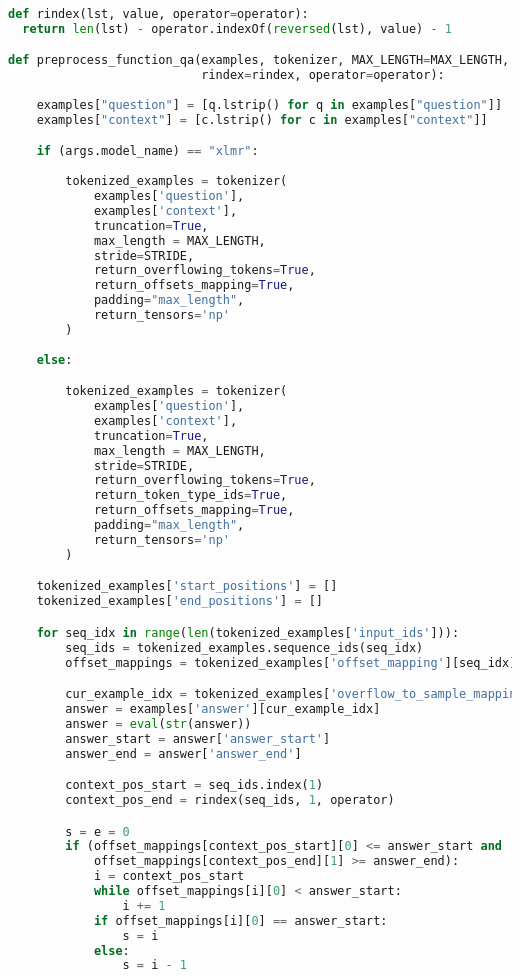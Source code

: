 \begin{lstlisting}[language=Python, caption=Proses \emph{preprocess} dan tokenisasi \emph{dataset} sistem tanya jawab]
def rindex(lst, value, operator=operator):
  return len(lst) - operator.indexOf(reversed(lst), value) - 1

def preprocess_function_qa(examples, tokenizer, MAX_LENGTH=MAX_LENGTH, STRIDE=STRIDE, 
                           rindex=rindex, operator=operator):
    
    examples["question"] = [q.lstrip() for q in examples["question"]]
    examples["context"] = [c.lstrip() for c in examples["context"]]

    if (args.model_name) == "xlmr":
        
        tokenized_examples = tokenizer(
            examples['question'],
            examples['context'],
            truncation=True,
            max_length = MAX_LENGTH,
            stride=STRIDE,
            return_overflowing_tokens=True,
            return_offsets_mapping=True,
            padding="max_length",
            return_tensors='np'
        )
    
    else:

        tokenized_examples = tokenizer(
            examples['question'],
            examples['context'],
            truncation=True,
            max_length = MAX_LENGTH,
            stride=STRIDE,
            return_overflowing_tokens=True,
            return_token_type_ids=True,
            return_offsets_mapping=True,
            padding="max_length",
            return_tensors='np'
        )

    tokenized_examples['start_positions'] = []
    tokenized_examples['end_positions'] = []

    for seq_idx in range(len(tokenized_examples['input_ids'])):
        seq_ids = tokenized_examples.sequence_ids(seq_idx)
        offset_mappings = tokenized_examples['offset_mapping'][seq_idx]

        cur_example_idx = tokenized_examples['overflow_to_sample_mapping'][seq_idx]
        answer = examples['answer'][cur_example_idx]
        answer = eval(str(answer))
        answer_start = answer['answer_start']
        answer_end = answer['answer_end']

        context_pos_start = seq_ids.index(1)
        context_pos_end = rindex(seq_ids, 1, operator)

        s = e = 0
        if (offset_mappings[context_pos_start][0] <= answer_start and 
            offset_mappings[context_pos_end][1] >= answer_end):
            i = context_pos_start
            while offset_mappings[i][0] < answer_start:
                i += 1
            if offset_mappings[i][0] == answer_start:
                s = i
            else:
                s = i - 1


\end{lstlisting}
